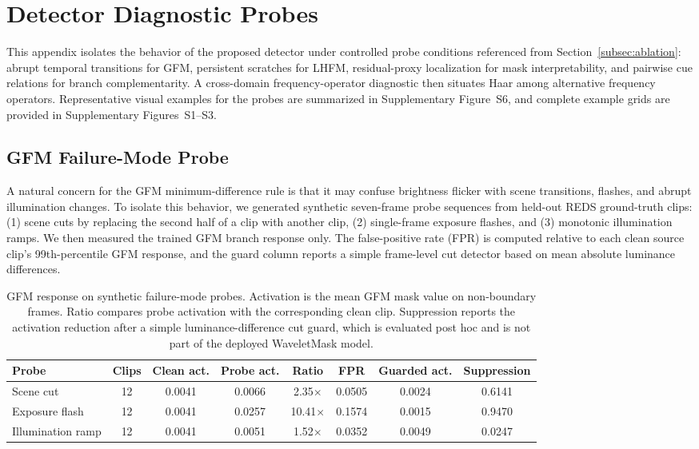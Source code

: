 \section{Detector Diagnostic Probes}\label{app:diagnostics}

This appendix isolates the behavior of the proposed detector under controlled probe conditions referenced from Section~\ref{subsec:ablation}: abrupt temporal transitions for GFM, persistent scratches for LHFM, residual-proxy localization for mask interpretability, and pairwise cue relations for branch complementarity. A cross-domain frequency-operator diagnostic then situates Haar among alternative frequency operators. Representative visual examples for the probes are summarized in Supplementary Figure~S6, and complete example grids are provided in Supplementary Figures~S1--S3.

\subsection{GFM Failure-Mode Probe}\label{subsec:gfm_failure_probe}

A natural concern for the GFM minimum-difference rule is that it may confuse brightness flicker with scene transitions, flashes, and abrupt illumination changes. To isolate this behavior, we generated synthetic seven-frame probe sequences from held-out REDS ground-truth clips: (1) scene cuts by replacing the second half of a clip with another clip, (2) single-frame exposure flashes, and (3) monotonic illumination ramps. We then measured the trained GFM branch response only. The false-positive rate (FPR) is computed relative to each clean source clip's 99th-percentile GFM response, and the guard column reports a simple frame-level cut detector based on mean absolute luminance differences.

\begin{table}[H]
\caption{GFM response on synthetic failure-mode probes. Activation is the mean GFM mask value on non-boundary frames. Ratio compares probe activation with the corresponding clean clip. Suppression reports the activation reduction after a simple luminance-difference cut guard, which is evaluated post hoc and is not part of the deployed WaveletMask model.\label{tab:gfm_failure_probe}}
\footnotesize
\begin{tabularx}{\textwidth}{lccCCCCC}
\toprule
\textbf{Probe} & \textbf{Clips} & \textbf{Clean act.} & \textbf{Probe act.} & \textbf{Ratio} & \textbf{FPR} & \textbf{Guarded act.} & \textbf{Suppression} \\
\midrule
Scene cut            & 12 & 0.0041 & 0.0066 & 2.35$\times$ & 0.0505 & 0.0024 & 0.6141 \\
Exposure flash       & 12 & 0.0041 & 0.0257 & 10.41$\times$ & 0.1574 & 0.0015 & 0.9470 \\
Illumination ramp    & 12 & 0.0041 & 0.0051 & 1.52$\times$ & 0.0352 & 0.0049 & 0.0247 \\
\bottomrule
\end{tabularx}
\normalsize
\end{table}

